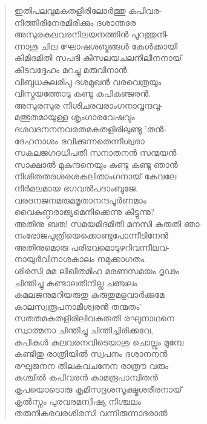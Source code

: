 \begin{verse}
ഇതിപലവുമകതളിരിലോര്‍ത്തു കപിവര-\\
നിത്തിരിനേരമിരിക്കും ദശാന്തരേ\\
അസുരകുലവരനിലയനത്തിന്‍ പുറത്തുനി-\\
ന്നാശു ചില ഘോഷശബ്ദങ്ങള്‍ കേള്‍ക്കായി\\
കിമിദമിതി സപദി കിസലയചലനിലീനനായ്\\
കീടവദ്ദേഹം മറച്ചു മരുവിനാന്‍.\\
വിബുധകുലരിപു ദശമുഖന്‍ വരവെത്രയും\\
വിസ്മയത്തോടു കണ്ടു കപികുഞ്ജരന്‍.\\
അസുരസുര നിശിചരവരാംഗനാവൃന്ദവു-\\
മത്ഭുതമായുള്ള ശൃംഗാരവേഷവും\\
ദശവദനനനവരതമകതളിരിലുണ്ടു ’തന്‍-\\
ദേഹനാശം ഭവിക്കുന്നതെന്നീശ്വരാ\\
സകലജഗദധിപതി സനാതനന്‍ സന്മയന്‍\\
സാക്ഷാല്‍ മുകുന്ദനെയും കണ്ടു കണ്ടു ഞാന്‍\\
നിശിതതരശരശകലിതാംഗനായ് കേവലേ\\
നിര്‍മലമായ ഭഗവല്‍പദാംബുജേ.\\
വരദനജനമരുമമൃതാനന്ദപൂര്‍ണമാം\\
വൈകുണ്ഠരാജ്യമെനിക്കെന്നു കിട്ടുന്നു?\\
അതിനു ബത! സമയമിദമിതി മനസി കരുതി ഞാ-\\
നംഭോജപുത്രിയെക്കൊണ്ടുപോന്നീടിനേന്‍\\
അതിനുമൊരു പരിഭവമൊടുഴറിവന്നീലവ-\\
നായുര്‍വിനാശകാലം നമുക്കാഗതം.\\
ശിരസി മമ ലിഖിതമിഹ മരണസമയം ദൃഢം\\
ചിന്തിച്ചു കണ്ടാലതിനില്ല ചഞ്ചലം\\
കമലജനുമറിയരുതു കരുതുമളവാര്‍ക്കുമേ\\
കാലസ്വരൂപനാമീശ്വരന്‍ തന്മതം’\\
സതതമകതളിരിലിവകരുതി രഘുനാഥനെ\\
സ്വാത്മനാ ചിന്തിച്ചു ചിന്തിച്ചിരിക്കവേ,\\
കപികള്‍ കുലവരനവിടെയാശു ചൊല്ലും മുമ്പേ\\
കണ്ടിതു രാത്രിയില്‍ സ്വപനം ദശാനനന്‍\\
രഘുജനന തിലകവചനേന രാത്രൗ വരും\\
കശ്ചില്‍ കപിവരന്‍ കാമരൂപാന്വിതന്‍\\
കൃപയൊടൊരു കൃമിസദൃശസൂക്ഷ്മശരീരനായ്\\
കൃല്‍സ്നം പുരവരമന്വിഷ്യ നിശ്ചലം\\
തരുനികരവരശിരസി വന്നിരുന്നാദരാല്‍\\

\end{verse}
